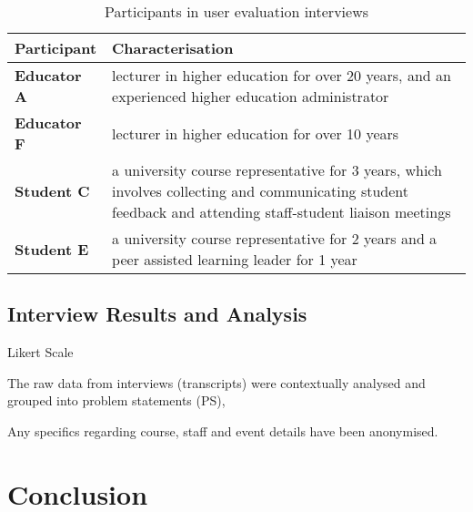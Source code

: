 \begin{table}[!h] 
    \caption{Participants in user evaluation interviews}
    \centering
    \label{table:participants-eval}
    \begin{tabularx}{\textwidth}{>{\bfseries}lX}
        Participant & Characterisation\\
        \toprule
        Educator A & lecturer in higher education for over 20 years, and an experienced higher education 
        administrator\\\midrule
        Educator F & lecturer in higher education for over 10 years\\\midrule
        Student C & a university course representative for 3 years, which involves collecting and 
        communicating student feedback and attending staff-student liaison meetings \\\midrule
        Student E & a university course representative for 2 years and a peer assisted learning leader 
        for 1 year\\\bottomrule
    \end{tabularx}
\end{table}


\subsection{Interview Results and Analysis}

Likert Scale

The raw data from interviews (transcripts) were contextually analysed and grouped into problem statements (PS), 

Any specifics regarding course, staff and event details have been anonymised.

\section{Conclusion}
